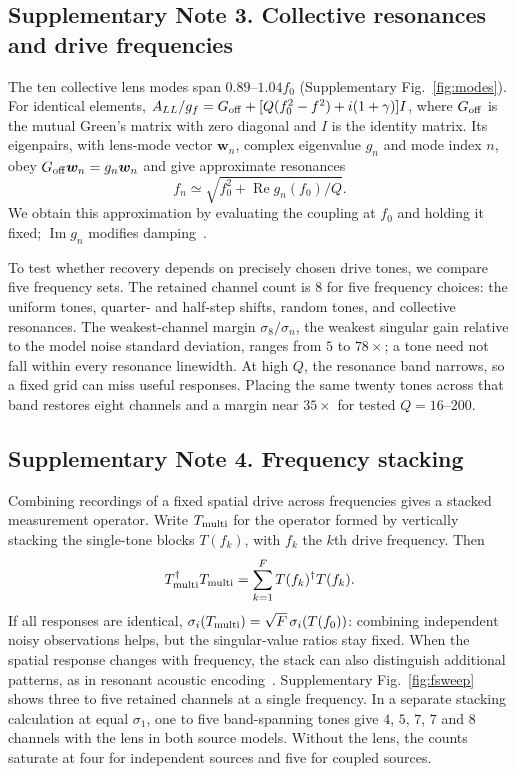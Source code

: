 \documentclass[pdflatex,sn-nature]{sn-jnl}%
\begin{document}
\subsection*{Supplementary Note 3. Collective resonances and drive frequencies}

The ten collective lens modes span $0.89$--$1.04f_0$
(Supplementary Fig.~\ref{fig:modes}). For identical elements,
$A_{LL}/g_f=G_{\rm off}+[Q(f_0^2-f^2)+i(1+\gamma)]I$, where
$G_{\rm off}$ is the mutual Green's matrix with zero diagonal and $I$ is the identity matrix.
Its eigenpairs, with lens-mode vector $\bm w_n$, complex eigenvalue $g_n$
and mode index $n$, obey $G_{\rm off}\bm w_n=g_n\bm w_n$ and give approximate resonances
\begin{equation}
 f_n\simeq\sqrt{f_0^2+\operatorname{Re}g_n(f_0)/Q}.
 \label{eq:fn}
\end{equation}
We obtain this approximation by evaluating the coupling at $f_0$ and holding it fixed; $\operatorname{Im}g_n$
modifies damping~\cite{ammari2015,lemoult2011prl}.

To test whether recovery depends on precisely chosen drive tones, we compare five frequency sets. The retained channel count is $8$ for five frequency choices: the uniform
tones, quarter- and half-step shifts, random tones, and collective resonances.
The weakest-channel margin $\sigma_8/\sigma_n$, the weakest singular gain relative to the model noise standard deviation, ranges from $5$ to $78\times$; a tone need not
fall within every resonance linewidth. At high $Q$, the resonance band narrows, so a fixed grid can miss useful responses. Placing the same twenty tones across that band restores eight
channels and a margin near $35\times$ for tested $Q=16$--$200$.


\subsection*{Supplementary Note 4. Frequency stacking}

Combining recordings of a fixed spatial drive across frequencies gives a stacked measurement operator. Write $T_{\rm multi}$ for the operator formed by vertically stacking the single-tone blocks $T(f_k)$, with $f_k$ the $k$th drive frequency. Then
\[
 T_{\rm multi}^{\dagger}T_{\rm multi}
 =\sum_{k=1}^{F}T(f_k)^{\dagger}T(f_k).
\]
If all responses are identical, $\sigma_i(T_{\rm multi})=\sqrt F\,\sigma_i(T(f_0))$: combining independent noisy observations helps, but the singular-value ratios stay fixed. When the spatial response changes with frequency, the stack can also distinguish additional patterns, as in resonant acoustic encoding~\cite{lemoult2011prl}.
Supplementary Fig.~\ref{fig:fsweep} shows three to five retained channels
at a single frequency. In a separate stacking calculation at equal $\sigma_1$, one to five band-spanning tones
give $4$, $5$, $7$, $7$ and $8$ channels with the lens in both source models.
Without the lens, the counts saturate at four for independent sources and
five for coupled sources.
\end{document}
